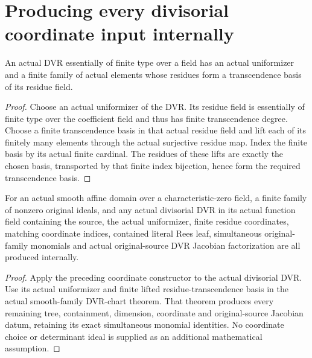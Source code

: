 \section{Producing every divisorial coordinate input internally}

\begin{lemma}\label{lem:sc0-actual-finite-dvr-coordinates}
\leanok
An actual DVR essentially of finite type over a field has an actual
uniformizer and a finite family of actual elements whose residues form a
transcendence basis of its residue field.
\end{lemma}
\begin{proof}
Choose an actual uniformizer of the DVR. Its residue field is essentially
of finite type over the coefficient field and thus has finite transcendence
degree. Choose a finite transcendence basis in that actual residue field
and lift each of its finitely many elements through the actual surjective
residue map. Index the finite basis by its actual finite cardinal. The
residues of these lifts are exactly the chosen basis, transported by that
finite index bijection, hence form the required transcendence basis.
\end{proof}

\begin{theorem}\label{thm:sc0-actual-smooth-family-divisorial-chart}
\leanok
{}
For an actual smooth affine domain over a characteristic-zero field,
a finite family of nonzero original ideals, and any actual divisorial DVR
in its actual function field containing the source, the actual uniformizer,
finite residue coordinates, matching coordinate indices, contained literal
Rees leaf, simultaneous original-family monomials and actual original-source
DVR Jacobian factorization are all produced internally.
\end{theorem}
\begin{proof}
Apply the preceding coordinate constructor to the actual divisorial DVR.
Use its actual uniformizer and finite lifted residue-transcendence basis in
the actual smooth-family DVR-chart theorem. That theorem produces every
remaining tree, containment, dimension, coordinate and original-source
Jacobian datum, retaining its exact simultaneous monomial identities.
No coordinate choice or determinant ideal is supplied as an additional
mathematical assumption.
\end{proof}
